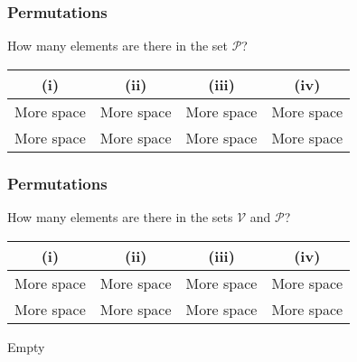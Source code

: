 \documentclass[IntroMain.tex]{subfiles}
\begin{document}
\begin{frame}

\frametitle{Permutations}
\Large
How many elements are there in the set $\mathcal{P}$?
\begin{center}
\begin{tabular}{|c|c|c|c|}
\hline (i) &  (ii) &  (iii) &  (iv) \\ 
\hline {\color{white}More space} &{\color{white}More space}  & {\color{white}More space} &{\color{white}More space}  \\ 
 {\color{white}More space} &{\color{white}More space}  & {\color{white}More space} &{\color{white}More space}  \\ 
\hline 
\end{tabular} 
\end{center}
\end{frame}
\begin{frame}

\frametitle{Permutations}
\Large
How many elements are there in the sets $\mathcal{V}$ and $\mathcal{P}$?
\begin{center}
\begin{tabular}{|c|c|c|c|}
\hline (i) &  (ii) &  (iii) &  (iv) \\ 
\hline {\color{white}More space} &{\color{white}More space}  & {\color{white}More space} &{\color{white}More space}  \\ 
 {\color{white}More space} &{\color{white}More space}  & {\color{white}More space} &{\color{white}More space}  \\ 
\hline 
\end{tabular} 
\end{center}
\end{frame}
\begin{frame}
Empty
\end{frame}
\end{document}
